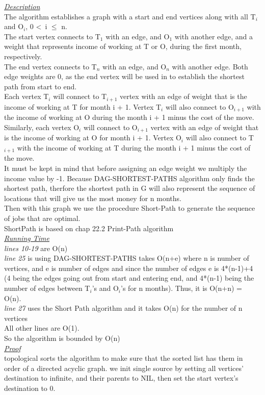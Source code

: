 \documentclass[10pt]{csc_assignment}
\begin{document}
\begin{description}
\emph{\underline{Description}}\\
The algorithm establishes a graph with a start and end vertices along with all T$_{i}$ and O$_{i}$, 0 \textless ~i $\leqslant$ n.\\
The start vertex connects to T$_{1}$ with an edge, and O$_{1}$ with another edge, and a weight that represents income of working at T or O, during the first month, respectively.\\
The end vertex connects to T$_{n}$ with an edge, and O$_{n}$ with another edge. Both edge weights are 0, as the end vertex will be used in to establish the shortest path from start to end.\\
Each vertex T$_{i}$ will connect to T$_{i+1}$ vertex with an edge of weight that is the income of working at T for month i + 1. Vertex T$_{i}$ will also connect to O$_{i+1}$ with the income of working at O during the month i + 1 minus the cost of the move.\\
Similarly, each vertex O$_{i}$ will connect to O$_{i+1}$ vertex with an edge of weight that is the income of working at O for month i + 1. Vertex O$_{i}$ will also connect to T$_{i+1}$ with the income of working at T during the month i + 1 minus the cost of the move.\\
It must be kept in mind that before assigning an edge weight we multiply the income value by -1. Because DAG-SHORTEST-PATHS algorithm only finds the shortest path, therfore the shortest path in G will also represent the sequence of locations that will give us the most money for n months.\\
Then with this graph we use the procedure Short-Path to generate the sequence of jobs that are optimal.\\
ShortPath is based on chap 22.2 Print-Path algorithm\\
\emph{\underline{Running Time}}\\
\emph{lines 10-19} are O(n)\\
\emph{line 25} is using DAG-SHORTEST-PATHS takes O(n+e) where n is number of vertices, and e is number of edges and since the number of edges e is 4*(n-1)+4 (4 being the edges going out from start and entering end, and 4*(n-1) being the number of edges between T$_{i}$'s and O$_{i}$'s for n months). Thus, it is O(n+n) = O(n). \\
\emph{line 27} uses the Short Path algorithm and it takes O(n) for the number of n vertices\\
All other lines are O(1).\\
So the algorithm is bounded by O(n) \\
\emph{\underline{Proof}}\\
topological sorts the algorithm to make sure that the sorted list has them in order of a directed acyclic graph.
we init single source by setting all vertices' destination to infinite, and their parents to NIL, then set the start vertex's destination to 0.


\end{description}
\end{document}
